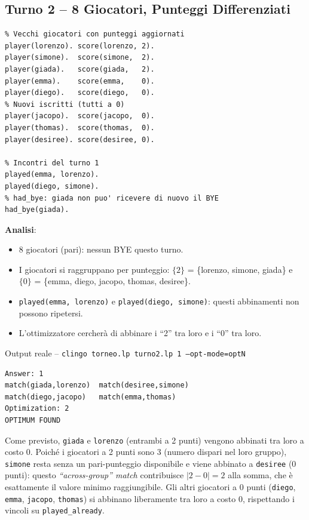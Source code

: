 \documentclass[12pt,a4paper]{article}
\begin{document}
\subsection{Turno 2 -- 8 Giocatori, Punteggi Differenziati}

\begin{lstlisting}
% Vecchi giocatori con punteggi aggiornati
player(lorenzo). score(lorenzo, 2).
player(simone).  score(simone,  2).
player(giada).   score(giada,   2).
player(emma).    score(emma,    0).
player(diego).   score(diego,   0).
% Nuovi iscritti (tutti a 0)
player(jacopo).  score(jacopo,  0).
player(thomas).  score(thomas,  0).
player(desiree). score(desiree, 0).

% Incontri del turno 1
played(emma, lorenzo).
played(diego, simone).
% had_bye: giada non puo' ricevere di nuovo il BYE
had_bye(giada).
\end{lstlisting}

\textbf{Analisi}:
\begin{itemize}[noitemsep]
  \item 8 giocatori (pari): nessun BYE questo turno.
  \item I giocatori si raggruppano per punteggio: $\{2\}$ = \{lorenzo, simone, giada\}
        e $\{0\}$ = \{emma, diego, jacopo, thomas, desiree\}.
  \item \texttt{played(emma, lorenzo)} e \texttt{played(diego, simone)}: questi
        abbinamenti non possono ripetersi.
  \item L'ottimizzatore cercherà di abbinare i ``2'' tra loro e i ``0'' tra loro.
\end{itemize}

\begin{exbox}{Output reale -- \texttt{clingo torneo.lp turno2.lp 1 --opt-mode=optN}}
\begin{verbatim}
Answer: 1
match(giada,lorenzo)  match(desiree,simone)
match(diego,jacopo)   match(emma,thomas)
Optimization: 2
OPTIMUM FOUND
\end{verbatim}
Come previsto, \texttt{giada} e \texttt{lorenzo} (entrambi a 2 punti) vengono
abbinati tra loro a costo 0. Poiché i giocatori a 2 punti sono 3 (numero
dispari nel loro gruppo), \texttt{simone} resta senza un pari-punteggio
disponibile e viene abbinato a \texttt{desiree} (0 punti): questo
\emph{``across-group'' match} contribuisce $|2-0|=2$ alla somma, che è
esattamente il valore minimo raggiungibile. Gli altri giocatori a 0 punti
(\texttt{diego}, \texttt{emma}, \texttt{jacopo}, \texttt{thomas}) si abbinano
liberamente tra loro a costo 0, rispettando i vincoli su \texttt{played\_already}.
\end{exbox}
\end{document}
